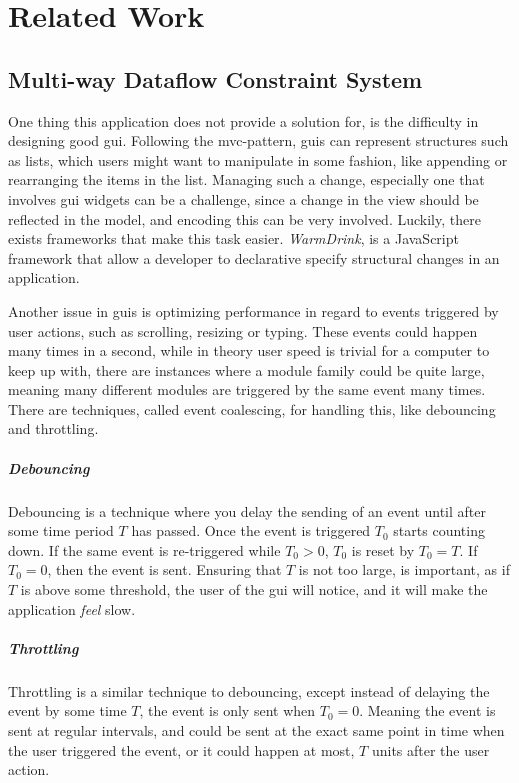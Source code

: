 \chapter{Related Work} \label{cha:related}

\section{Multi-way Dataflow Constraint System} \label{sec:mdcs}

One thing this application does not provide a solution for, is the difficulty
in designing good \gls{gui}. Following the \gls{mvc}-pattern, \gls{gui}s can
represent structures such as lists, which users might want to manipulate in
some fashion, like appending or rearranging the items in the list. Managing such
a change, especially one that involves \gls{gui} widgets can be a challenge,
since a change in the view should be reflected in the model, and encoding this
can be very involved. Luckily, there exists frameworks that make this task
easier. \textit{WarmDrink}, \cite{warmDrink} \cite{dslMdcs} is a JavaScript
framework that allow a developer to declarative specify structural changes in
an application. 

Another issue in \gls{gui}s is optimizing performance in regard to events
triggered by user actions, such as scrolling, resizing or typing. These events
could happen many times in a second, while in theory user speed is trivial for a
computer to keep up with, there are instances where a module family could be
quite large, meaning many different modules are triggered by the same event many
times. There are techniques, called event coalescing, for handling this, like
debouncing and throttling.

\paragraph{Debouncing} Debouncing is a technique where you delay the sending of
an event until after some time period $T$ has passed. Once the event is triggered
$T_0$ starts counting down. If the same event is re-triggered while $T_0 > 0$,
$T_0$ is reset by $T_0 = T$. If $T_0 = 0$, then the event is sent. Ensuring that
$T$ is not too large, is important, as if $T$ is above some threshold, the user
of the \gls{gui} will notice, and it will make the application \textit{feel}
slow.

\paragraph{Throttling} Throttling is a similar technique to debouncing, except
instead of delaying the event by some time $T$, the event is only sent when
$T_0 = 0$. Meaning the event is sent at regular intervals, and could be sent at
the exact same point in time when the user triggered the event, or it could
happen at most, $T$ units after the user action.

